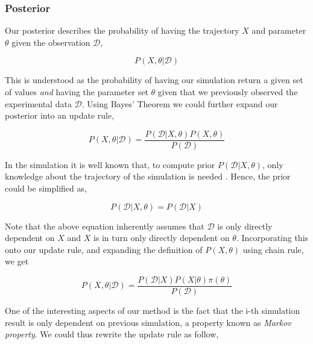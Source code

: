 \documentclass{bioinfo}
\begin{document}
\subsubsection{Posterior}

Our posterior describes the probability of having the trajectory $X$ and parameter $\theta$ given the observation $\mathcal{D}$,

\begin{equation}
P(X, \theta | \mathcal{D})\label{eq:03}
\end{equation}

This is understood as the probability of having our simulation return a given set of values \textit{and} having the parameter set $\theta$ given that we previously observed the experimental data $\mathcal{D}$. Using Bayes' Theorem we could further expand our posterior into an update rule,

\begin{equation}
P(X, \theta | \mathcal{D}) = \frac{P(\mathcal{D} | X, \theta)  P(X, \theta)}{P(\mathcal{D})}\label{eq:04}
\end{equation}

In the simulation it is well known that, to compute prior $P(\mathcal{D} | X, \theta)$, only knowledge about the trajectory of the simulation is needed \citep{Feigelman16}. Hence, the prior could be simplified as,

\begin{equation}
P(\mathcal{D} | X, \theta) = P(\mathcal{D} | X)\label{eq:05}
\end{equation}

Note that the above equation inherently assumes that $\mathcal{D}$ is only directly dependent on $X$ and $X$ is in turn only directly dependent on $\theta$. Incorporating this onto our update rule, and expanding the definition of $P(X, \theta)$ using chain rule, we get

\begin{equation}
P(X, \theta | \mathcal{D}) = \frac{P(\mathcal{D} | X)  P(X | \theta) \pi(\theta)}{P(\mathcal{D})}\label{eq:06}
\end{equation}

One of the interesting aspects of our method is the fact that the i-th simulation result is only dependent on previous simulation, a property known as \textit{Markov property}. We could thus rewrite the update rule as follow,


\end{document}
